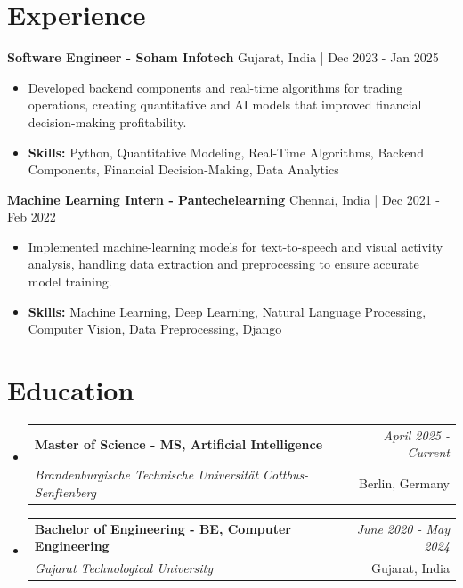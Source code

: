 \documentclass[a4paper,11pt]{article}
\makeatletter
\newcommand{\resumeSubheading}[4]{
\vspace{0.5mm}\item
    \begin{tabular*}{\linewidth}[t]{l@{\extracolsep{\fill}}r}
        \textbf{#1} & \textit{\footnotesize{#4}} \\
        \textit{\footnotesize{#3}} &  \footnotesize{#2}\\
    \end{tabular*}
    \vspace{-2.4mm}
}
\makeatother
\begin{document}
\section{\textbf{Experience}}


\vspace{1mm}
  \textbf{Software Engineer - Soham Infotech} \hfill Gujarat, India | Dec 2023 - Jan 2025
\vspace{-1.5mm} %
\begin{itemize}
  \item Developed backend components and real-time algorithms for trading operations, creating quantitative and AI models that improved financial decision-making profitability.

\vspace{-2mm}
  \item \textbf{Skills:} Python, Quantitative Modeling, Real-Time Algorithms, Backend Components, Financial Decision-Making, Data Analytics
\end{itemize}

\vspace{1mm}
  \textbf{Machine Learning Intern - Pantechelearning} \hfill Chennai, India | Dec 2021 - Feb 2022
\vspace{-1.5mm} %
\begin{itemize}
  \item Implemented machine-learning models for text-to-speech and visual activity analysis, handling data extraction and preprocessing to ensure accurate model training.
\vspace{-2mm}
  \item \textbf{Skills:} Machine Learning, Deep Learning, Natural Language Processing, Computer Vision, Data Preprocessing, Django
\end{itemize}\section{\textbf{Education}}
\vspace{-0.4mm}

\begin{itemize}[leftmargin=0.15in, label={}]
\resumeSubheading
{Master of Science - MS, Artificial Intelligence }{Berlin, Germany}
{Brandenburgische Technische Universität Cottbus-Senftenberg  }{April 2025 - Current}

\vspace{1.0mm} %
\resumeSubheading
{Bachelor of Engineering - BE, Computer Engineering  }{Gujarat, India}
{Gujarat Technological University }{June 2020 - May 2024}

\end{itemize}
\end{document}
